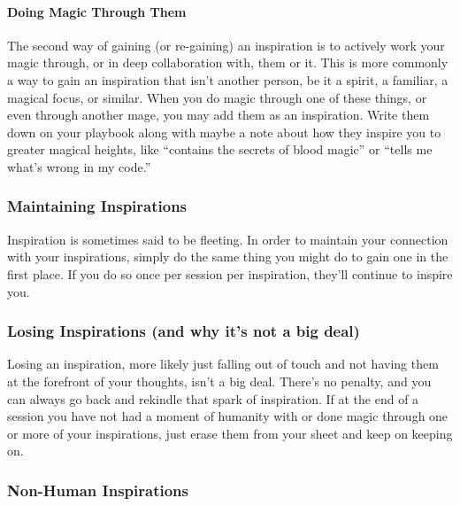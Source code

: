 \documentclass[
]{article}
\begin{document}
\hypertarget{doing-magic-through-them}{%
\paragraph{Doing Magic Through Them}\label{doing-magic-through-them}}

The second way of gaining (or re-gaining) an inspiration is to actively
work your magic through, or in deep collaboration with, them or it. This
is more commonly a way to gain an inspiration that isn't another person,
be it a spirit, a familiar, a magical focus, or similar. When you do
magic through one of these things, or even through another mage, you may
add them as an inspiration. Write them down on your playbook along with
maybe a note about how they inspire you to greater magical heights, like
``contains the secrets of blood magic'' or ``tells me what's wrong in my
code.''

\hypertarget{maintaining-inspirations}{%
\subsubsection{Maintaining
Inspirations}\label{maintaining-inspirations}}

Inspiration is sometimes said to be fleeting. In order to maintain your
connection with your inspirations, simply do the same thing you might do
to gain one in the first place. If you do so once per session per
inspiration, they'll continue to inspire you.

\hypertarget{losing-inspirations-and-why-its-not-a-big-deal}{%
\subsubsection{Losing Inspirations (and why it's not a big
deal)}\label{losing-inspirations-and-why-its-not-a-big-deal}}

Losing an inspiration, more likely just falling out of touch and not
having them at the forefront of your thoughts, isn't a big deal. There's
no penalty, and you can always go back and rekindle that spark of
inspiration. If at the end of a session you have not had a moment of
humanity with or done magic through one or more of your inspirations,
just erase them from your sheet and keep on keeping on.

\hypertarget{non-human-inspirations}{%
\subsubsection{Non-Human Inspirations}\label{non-human-inspirations}}
\end{document}
